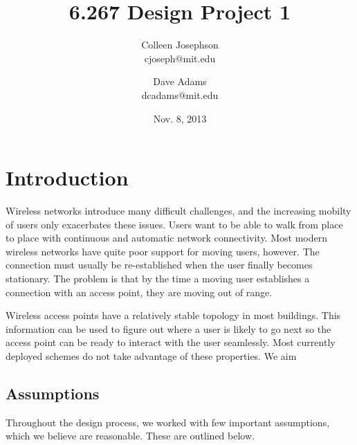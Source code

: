 \documentclass[letterpaper,12pt]{article}
\begin{document}
\title{\Large \bf 6.267 Design Project 1}
\author{
{\rm Colleen Josephson}\\
cjoseph@mit.edu
\and
{\rm Dave Adams}\\
dcadams@mit.edu
} %

\date{Nov. 8, 2013}

\maketitle


\section{Introduction}

Wireless networks introduce many difficult challenges, and the increasing 
mobilty of users only exacerbates these issues. Users want to be able to walk 
from place to place with continuous and automatic network connectivity. Most
modern wireless networks have quite poor support for moving users, however.
The connection must usually be re-established when the user finally becomes
stationary. The problem is that by the time a moving user establishes a 
connection with an access point, they are moving out of range. 

Wireless access points have a relatively stable topology in most buildings.
This information can be used to figure out where a user is likely to go 
next so the access point can be ready to interact with the user seamlessly.
Most currently deployed schemes do not take advantage of these properties.
We aim 

\subsection{Assumptions}

Throughout the design process, we worked with few important assumptions, which
we believe are reasonable. These are outlined below.
\end{document}
